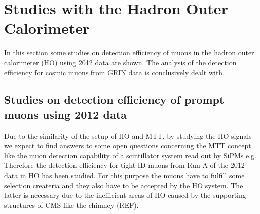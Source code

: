 \section{Studies with the Hadron Outer Calorimeter}
	In this section some studies on detection efficiency of muons in the hadron outer calorimeter (HO) using 2012 data are shown.
	The analysis of the detection efficiency for cosmic muons from GRIN data is conclusively dealt with.
	\subsection{Studies on detection efficiency of prompt muons using 2012 data}
		Due to the similarity of the setup of HO and MTT, by studying the HO signals we expect to find answers to some open questions concerning the MTT concept like the muon detection capability of a
		scintillator system read out by SiPMs e.g.
		Therefore the detection efficiency for tight ID muons from Run A of the 2012 data in HO has been studied.
		For this purpose the muons have to fulfill some selection createria and they also have to be accepted by the HO system.
		The latter is necessary due to the inefficient areas of HO caused by the supporting structures of CMS like the chimney (REF).
